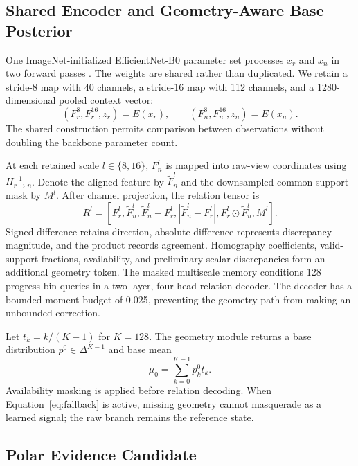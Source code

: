 \documentclass[electronics,article,submit,oneauthor]{Definitions/mdpi}
\begin{document}
\subsection{Shared Encoder and Geometry-Aware Base Posterior}
\label{subsec:geometry}

One ImageNet-initialized EfficientNet-B0 parameter set processes $x_r$ and $x_n$ in two forward passes \cite{tan2019efficientnet}. The weights are shared rather than duplicated. We retain a stride-8 map with 40 channels, a stride-16 map with 112 channels, and a 1280-dimensional pooled context vector:
\begin{equation}
(F_r^8,F_r^{16},z_r)=E(x_r),\qquad (F_n^8,F_n^{16},z_n)=E(x_n).
\label{eq:encoder}
\end{equation}
The shared construction permits comparison between observations without doubling the backbone parameter count.

At each retained scale $l\in\{8,16\}$, $F_n^l$ is mapped into raw-view coordinates using $H_{r\rightarrow n}^{-1}$. Denote the aligned feature by $\widetilde{F}_n^l$ and the downsampled common-support mask by $M^l$. After channel projection, the relation tensor is
\begin{equation}
R^l=\left[F_r^l,\widetilde{F}_n^l,\widetilde{F}_n^l-F_r^l,
|\widetilde{F}_n^l-F_r^l|,F_r^l\odot\widetilde{F}_n^l,M^l\right].
\label{eq:relation}
\end{equation}
Signed difference retains direction, absolute difference represents discrepancy magnitude, and the product records agreement. Homography coefficients, valid-support fractions, availability, and preliminary scalar discrepancies form an additional geometry token. The masked multiscale memory conditions 128 progress-bin queries in a two-layer, four-head relation decoder. The decoder has a bounded moment budget of 0.025, preventing the geometry path from making an unbounded correction.

Let $t_k=k/(K-1)$ for $K=128$. The geometry module returns a base distribution $p^0\in\Delta^{K-1}$ and base mean
\begin{equation}
\mu_0=\sum_{k=0}^{K-1}p_k^0t_k.
\label{eq:base_mean}
\end{equation}
Availability masking is applied before relation decoding. When Equation~\eqref{eq:fallback} is active, missing geometry cannot masquerade as a learned signal; the raw branch remains the reference state.

\subsection{Polar Evidence Candidate}
\label{subsec:polar}
\end{document}
